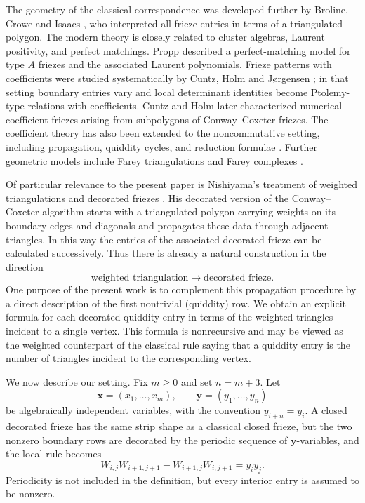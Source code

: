 \documentclass[amstex,11pt,reqno]{amsart}
\theoremstyle{definition}
\newcommand{\bx}{\bm{x}}
\newcommand{\by}{\bm{y}}
\begin{document}
The geometry of the classical correspondence was developed further by Broline, Crowe and Isaacs \cite{BCI}, who interpreted all frieze entries in terms of a triangulated polygon. The modern theory is closely related to cluster algebras, Laurent positivity, and perfect matchings. Propp \cite{Propp2020} described a perfect-matching model for type $A$ friezes and the associated Laurent polynomials. Frieze patterns with coefficients were studied systematically by Cuntz, Holm and J\o rgensen \cite{CHJ2020}; in that setting boundary entries vary and local determinant identities become Ptolemy-type relations with coefficients. Cuntz and Holm \cite{CH2021} later characterized numerical coefficient friezes arising from subpolygons of Conway--Coxeter friezes. The coefficient theory has also been extended to the noncommutative setting, including propagation, quiddity cycles, and reduction formulae \cite{CHJ2024}. Further geometric models include Farey triangulations and Farey complexes \cite{MOT2015,Short2025}.

Of particular relevance to the present paper is Nishiyama's treatment of weighted triangulations and decorated friezes \cite[Chapters~10--11]{Nishiyama2022}. His decorated version of the Conway--Coxeter algorithm starts with a triangulated polygon carrying weights on its boundary edges and diagonals and propagates these data through adjacent triangles. In this way the entries of the associated decorated frieze can be calculated successively. Thus there is already a natural construction in the direction
\[
 \text{weighted triangulation}
 \longrightarrow
 \text{decorated frieze}.
\]
One purpose of the present work is to complement this propagation procedure by a direct description of the first nontrivial (quiddity) row. We obtain an explicit formula for each decorated quiddity entry in terms of the weighted triangles incident to a single vertex. This formula is nonrecursive and may be viewed as the weighted counterpart of the classical rule saying that a quiddity entry is the number of triangles incident to the corresponding vertex.

We now describe our setting. Fix $m\geq0$ and set $n=m+3$. Let
\[
 \bx=(x_1,\ldots,x_m),\qquad
 \by=(y_1,\ldots,y_n)
\]
be algebraically independent variables, with the convention $y_{i+n}=y_i$. A closed decorated frieze has the same strip shape as a classical closed frieze, but the two nonzero boundary rows are decorated by the periodic sequence of $\by$-variables, and the local rule becomes
\begin{equation}\label{eq:intro-rule}
 W_{i,j}W_{i+1,j+1}-W_{i+1,j}W_{i,j+1}=y_i y_j.
\end{equation}
Periodicity is not included in the definition, but every interior entry is assumed to be nonzero.
\end{document}
